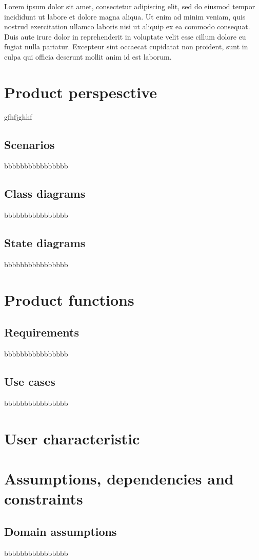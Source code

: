 Lorem ipsum dolor sit amet, consectetur adipiscing elit, sed do eiusmod tempor incididunt ut labore et dolore magna aliqua. Ut enim ad minim veniam, quis nostrud exercitation ullamco laboris nisi ut aliquip ex ea commodo consequat. Duis aute irure dolor in reprehenderit in voluptate velit esse cillum dolore eu fugiat nulla pariatur. Excepteur sint occaecat cupidatat non proident, sunt in culpa qui officia deserunt mollit anim id est laborum.

\newpage

\section{Product perspesctive}
\label{sec:product_perspesctive}%
gfhfjghhf

\subsection{Scenarios}
\label{subsec:scenarios}%
bbbbbbbbbbbbbbbb

\subsection{Class diagrams}
\label{subsec:class_diagrams}%
bbbbbbbbbbbbbbbb

\subsection{State diagrams}
\label{subsec:state_diagrams}%
bbbbbbbbbbbbbbbb

\section{Product functions}
\label{sec:scenarios}%

\subsection{Requirements}
\label{subsec:requirements}%
bbbbbbbbbbbbbbbb

\subsection{Use cases}
\label{subsec:use_cases}%
bbbbbbbbbbbbbbbb

\section{User characteristic}
\label{sec:user_characteristic}%

\section{Assumptions, dependencies and constraints}
\label{sec:scenarios}%

\subsection{Domain assumptions}
\label{subsec:domain_assumptions}%
bbbbbbbbbbbbbbbb
